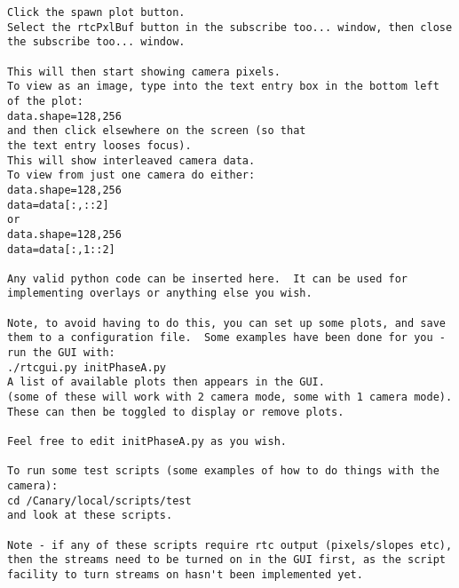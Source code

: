 \begin{verbatim}
Click the spawn plot button.
Select the rtcPxlBuf button in the subscribe too... window, then close
the subscribe too... window.

This will then start showing camera pixels.
To view as an image, type into the text entry box in the bottom left
of the plot:
data.shape=128,256
and then click elsewhere on the screen (so that
the text entry looses focus).
This will show interleaved camera data.
To view from just one camera do either:
data.shape=128,256
data=data[:,::2]
or
data.shape=128,256
data=data[:,1::2]

Any valid python code can be inserted here.  It can be used for
implementing overlays or anything else you wish.

Note, to avoid having to do this, you can set up some plots, and save
them to a configuration file.  Some examples have been done for you -
run the GUI with:
./rtcgui.py initPhaseA.py
A list of available plots then appears in the GUI.
(some of these will work with 2 camera mode, some with 1 camera mode).
These can then be toggled to display or remove plots.

Feel free to edit initPhaseA.py as you wish.

To run some test scripts (some examples of how to do things with the camera):
cd /Canary/local/scripts/test
and look at these scripts.

Note - if any of these scripts require rtc output (pixels/slopes etc),
then the streams need to be turned on in the GUI first, as the script
facility to turn streams on hasn't been implemented yet.


\end{verbatim}
